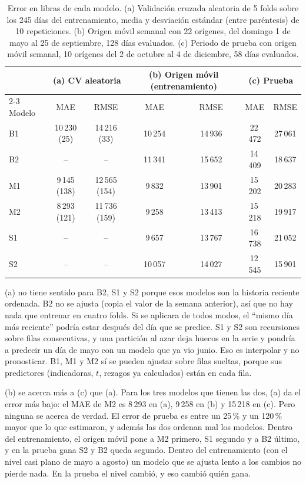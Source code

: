 \documentclass[11pt]{article}
\begin{document}
\begin{table}[H]
\centering
\caption{Error en libras de cada modelo. (a) Validación cruzada aleatoria de 5 folds sobre los 245
días del entrenamiento, media y desviación estándar (entre paréntesis) de 10 repeticiones. (b)
Origen móvil semanal con 22 orígenes, del domingo 1 de mayo al 25 de septiembre, 128 días
evaluados. (c) Periodo de prueba con origen móvil semanal, 10 orígenes del 2 de octubre al 4 de
diciembre, 58 días evaluados.}\label{tab:validacion}
\small
\begin{tabular}{|l|c|c|c|c|c|c|}
\hline
& \multicolumn{2}{c|}{(a) CV aleatoria} & \multicolumn{2}{c|}{(b) Origen móvil (entrenamiento)} & \multicolumn{2}{c|}{(c) Prueba} \\
\cline{2-3}\cline{4-5}\cline{6-7}
Modelo & MAE & RMSE & MAE & RMSE & MAE & RMSE \\
\hline
B1 & 10\,230 (25) & 14\,216 (33) & 10\,254 & 14\,936 & 22\,472 & 27\,061 \\
B2 & -- & -- & 11\,341 & 15\,652 & 14\,409 & 18\,637 \\
M1 & 9\,145 (138) & 12\,565 (154) & 9\,832 & 13\,901 & 15\,202 & 20\,283 \\
M2 & 8\,293 (121) & 11\,736 (159) & 9\,258 & 13\,413 & 15\,218 & 19\,917 \\
S1 & -- & -- & 9\,657 & 13\,767 & 16\,738 & 21\,052 \\
S2 & -- & -- & 10\,057 & 14\,027 & 12\,545 & 15\,901 \\
\hline
\end{tabular}
\end{table}

(a) no tiene sentido para B2, S1 y S2 porque esos modelos son la historia reciente
ordenada. B2 no se ajusta (copia el valor de la semana anterior), así que no hay nada que
entrenar en cuatro folds. Si se aplicara de todos modos, el ``mismo día más reciente'' podría
estar después del día que se predice. S1 y S2 son recursiones sobre filas consecutivas, y una
partición al azar deja huecos en la serie y pondría a predecir un día de mayo con un modelo que
ya vio junio. Eso es interpolar y no pronosticar. B1, M1 y M2 sí se pueden ajustar sobre filas
sueltas, porque sus predictores (indicadoras, $t$, rezagos ya calculados) están en cada fila.

(b) se acerca más a (c) que (a). Para los tres modelos que tienen las dos, (a) da el error
más bajo: el MAE de M2 es 8\,293 en (a), 9\,258 en (b) y 15\,218 en (c). Pero ninguna se
acerca de verdad. El error de prueba es entre un 25\,\% y un 120\,\% mayor que lo que estimaron, y además
las dos ordenan mal los modelos. Dentro del entrenamiento, el origen móvil pone a M2 primero, S1 segundo y
a B2 último, y en la prueba gana S2 y B2 queda segundo. Dentro del entrenamiento (con el nivel
casi plano de mayo a agosto) un modelo que se ajusta lento a los cambios no pierde nada. En la
prueba el nivel cambió, y eso cambió quién gana.
\end{document}
